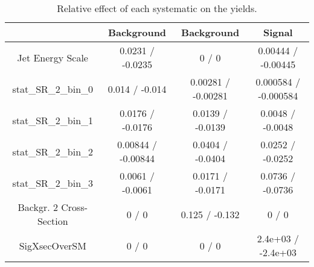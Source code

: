 \documentclass[10pt]{article}
\begin{document}
\begin{table}[htbp]
\begin{center}
\begin{tabular}{|c|c|c|c|}
\hline 
      & Background      & Background      & Signal \\ 
\hline 
  Jet Energy Scale & 0.0231 / -0.0235 & 0 / 0 & 0.00444 / -0.00445 \\ 
 stat_SR_2_bin_0 & 0.014 / -0.014 & 0.00281 / -0.00281 & 0.000584 / -0.000584 \\ 
 stat_SR_2_bin_1 & 0.0176 / -0.0176 & 0.0139 / -0.0139 & 0.0048 / -0.0048 \\ 
 stat_SR_2_bin_2 & 0.00844 / -0.00844 & 0.0404 / -0.0404 & 0.0252 / -0.0252 \\ 
 stat_SR_2_bin_3 & 0.0061 / -0.0061 & 0.0171 / -0.0171 & 0.0736 / -0.0736 \\ 
  Backgr. 2 Cross-Section & 0 / 0 & 0.125 / -0.132 & 0 / 0 \\ 
 SigXsecOverSM & 0 / 0 & 0 / 0 & 2.4e+03 / -2.4e+03 \\ 
\hline 
\end{tabular} 
\caption{Relative effect of each systematic on the yields.} 
\end{center} 
\end{table} 
\end{document}

